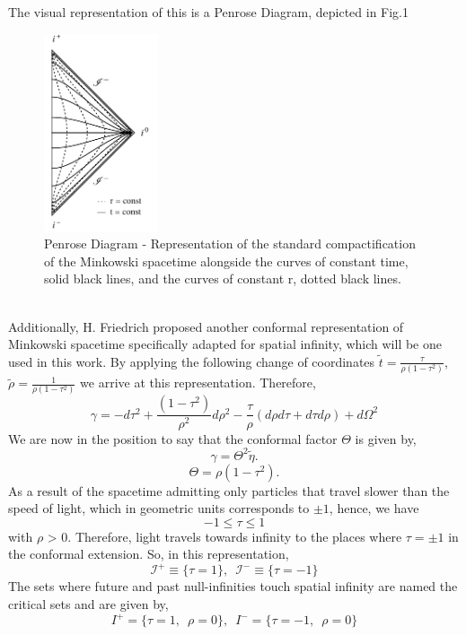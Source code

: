 The visual representation of this is a Penrose Diagram, depicted in Fig.1
\begin{figure}[h]
	\centering \includegraphics[width =0.3\textwidth]{Penrose diagram.pdf}
    \caption{Penrose Diagram - Representation of the standard
      compactification of the Minkowski spacetime alongside the curves of constant
      time, solid black lines, and the curves of constant r, dotted
      black lines.}
\end{figure}
\\
Additionally, H. Friedrich proposed another conformal representation of Minkowski spacetime specifically adapted for spatial infinity, which will be one used in this work. By applying the following change of coordinates $\tilde{t} = \frac{\tau}{\rho(1-\tau^{2})}$, \enspace $\tilde{\rho} = \frac{1}{\rho(1-\tau^{2})}$ we arrive at this representation. Therefore,
$$ \gamma=-d \tau^2+\frac{\left(1-\tau^2\right)}{\rho^2} d\rho^2-\frac{\tau}{\rho}(d \rho d \tau+d \tau d \rho)+d \Omega^2 $$
We are now in the position to say that the conformal factor $\Theta$ is given by,
\begin{equation}\label{eq:gamma}
	\gamma = \Theta^2 \tilde{\eta}.
\end{equation}
\begin{equation}\label{eq:conf-factor}
	\Theta = \rho(1-\tau^2).
\end{equation}
As a result of the spacetime admitting only particles that travel slower than the speed of light, which in geometric units corresponds to $\pm 1$, hence, we have  
$$ -1 \le \tau \le 1 $$ 
with $\rho$ > 0. Therefore, light travels towards infinity to the places where $\tau = \pm 1$ in the conformal extension. So, in this representation,
$$ \mathscr{I}^+ \equiv \{ \tau = 1 \}, \enspace \mathscr{I}^- \equiv \{ \tau = -1 \}$$ 
The sets where future and past null-infinities touch spatial infinity are named the critical sets and are given by,
$$ {I}^+ = \{ \tau = 1, \enspace \rho = 0\}, \enspace {I}^- = \{ \tau = -1, \enspace \rho = 0\}$$

